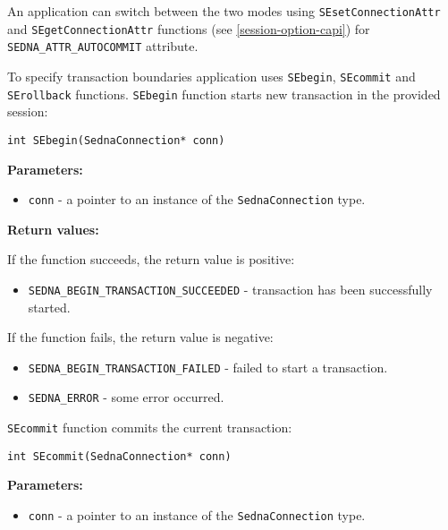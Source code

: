 \documentclass[a4paper,12pt]{article}
\newenvironment{citemize}
{\begin{itemize}
  \setlength{\itemsep}{0pt}
  \setlength{\parskip}{0pt}
  \setlength{\parsep}{0pt}}
{\end{itemize}}
\begin{document}
An application can switch between the two modes using \verb!SEsetConnectionAttr!
and \verb!SEgetConnectionAttr! functions (see \ref{session-option-capi}) for
\verb!SEDNA_ATTR_AUTOCOMMIT! attribute.

To specify transaction boundaries application uses \verb!SEbegin!,
\verb!SEcommit! and \verb!SErollback! functions. \verb!SEbegin! function starts
new transaction in the provided session:

\begin{verbatim}
int SEbegin(SednaConnection* conn)
\end{verbatim}

\noindent
\textbf{Parameters:}

\begin{citemize}
\item\verb!conn! - a pointer to an instance of the \verb!SednaConnection! type.
\end{citemize}

\noindent
\textbf{Return values:}

\medskip

\noindent
If the function succeeds, the return value is positive:

\begin{citemize}
\item\verb!SEDNA_BEGIN_TRANSACTION_SUCCEEDED! - transaction has been
successfully started.
\end{citemize}

\noindent
If the function fails, the return value is negative:

\begin{citemize}
\item\verb!SEDNA_BEGIN_TRANSACTION_FAILED! - failed to start a transaction. 
\item\verb!SEDNA_ERROR! - some error occurred.
\end{citemize}

\verb!SEcommit! function commits the current transaction:

\begin{verbatim}
int SEcommit(SednaConnection* conn)
\end{verbatim}

\noindent
\textbf{Parameters:}

\begin{citemize}
\item\verb!conn! - a pointer to an instance of the \verb!SednaConnection! type.
\end{citemize}
\end{document}
